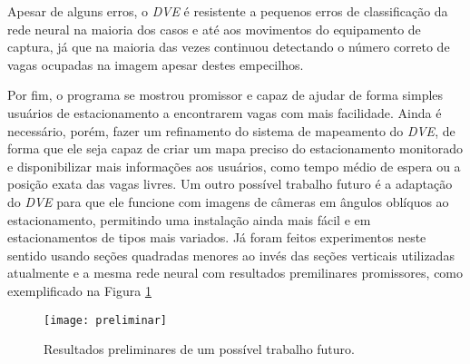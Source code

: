 Apesar de alguns erros, o \textit{DVE} é resistente a pequenos erros de classificação da rede neural na maioria dos casos e até aos movimentos do equipamento de captura, já que na maioria das vezes continuou detectando o número correto de vagas ocupadas na imagem apesar destes empecilhos.

Por fim, o programa se mostrou promissor e capaz de ajudar de forma simples usuários de estacionamento a encontrarem vagas com mais facilidade. Ainda é necessário, porém, fazer um refinamento do sistema de mapeamento do \textit{DVE}, de forma que ele seja capaz de criar um mapa preciso do estacionamento monitorado e disponibilizar mais informações aos usuários, como tempo médio de espera ou a posição exata das vagas livres. Um outro possível trabalho futuro é a adaptação do \textit{DVE} para que ele funcione com imagens de câmeras em ângulos oblíquos ao estacionamento, permitindo uma instalação ainda mais fácil e em estacionamentos de tipos mais variados. Já foram feitos experimentos neste sentido usando seções quadradas menores ao invés das seções verticais utilizadas atualmente e a mesma rede neural com resultados premilinares promissores, como exemplificado na Figura \ref{fig:preliminares}

\begin{figure}%
\centering
\texttt{[image: preliminar]}%
\caption{Resultados preliminares de um possível trabalho futuro.}%
\label{fig:preliminares}%
\centering
\end{figure}









